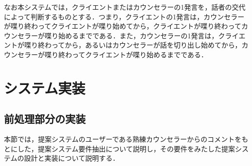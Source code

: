 \documentclass[shuuron]{kuee}
\begin{document}



なお本システムでは，クライエントまたはカウンセラーの1発言を，話者の交代によって判断するものとする．つまり，クライエントの1発言は，カウンセラーが喋り終わってクライエントが喋り始めてから，クライエントが喋り終わってカウンセラーが喋り始めるまでである．また，カウンセラーの1発言は，クライエントが喋り終わってから，あるいはカウンセラーが話を切り出し始めてから，カウンセラーが喋り終わってクライエントが喋り始めるまでである．

\section{システム実装}

\subsection{前処理部分の実装}

本節では，提案システムのユーザーである熟練カウンセラーからのコメントをもとにした，提案システム要件抽出について説明し，その要件をみたした提案システムの設計と実装について説明する．

\end{document}

